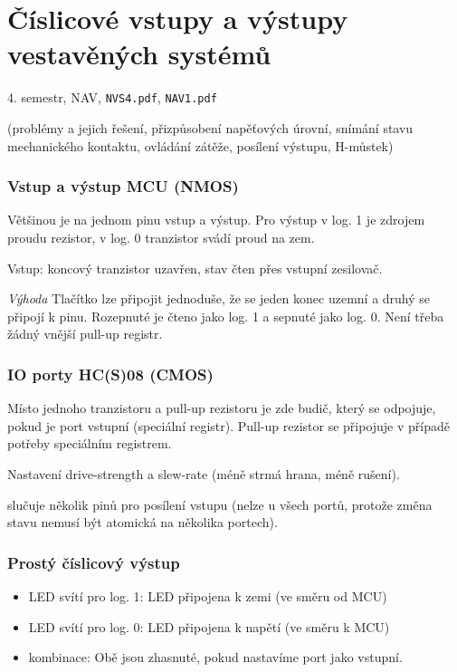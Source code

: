 \documentclass[a4paper, 11pt]{report}
\begin{document}
\chapter{Číslicové vstupy a výstupy vestavěných systémů} \label{cha:60}
4. semestr, NAV, \texttt{NVS4.pdf}, \texttt{NAV1.pdf}

(problémy a jejich řešení, přizpůsobení napěťových úrovní, snímání stavu mechanického kontaktu, ovládání zátěže, posílení výstupu, H-můstek)

\subsection{Vstup a výstup MCU (NMOS)}
Většinou je na jednom pinu vstup a výstup. Pro výstup v log. 1 je zdrojem proudu rezistor, v log. 0 tranzistor svádí proud na zem.

Vstup: koncový tranzistor uzavřen, stav čten přes vstupní zesilovač.

\emph{Výhoda} Tlačítko lze připojit jednoduše, že se jeden konec uzemní a druhý se připojí k pinu. Rozepnuté je čteno jako log. 1 a sepnuté jako log. 0. Není třeba žádný vnější pull-up registr.

\subsection{IO porty HC(S)08 (CMOS)}
Místo jednoho tranzistoru a pull-up rezistoru je zde budič, který se odpojuje, pokud je port vstupní (speciální registr). Pull-up rezistor se připojuje v případě potřeby speciálním registrem.

Nastavení drive-strength a slew-rate (méně strmá hrana, méně rušení).

 slučuje několik pinů pro posílení vstupu (nelze u všech portů, protože změna stavu nemusí být atomická na několika portech).

\subsection{Prostý číslicový výstup}
\begin{itemize}
	\item LED svítí pro log. 1: LED připojena k zemi (ve směru od MCU)
	\item LED svítí pro log. 0: LED připojena k napětí (ve směru k MCU)
	\item kombinace: Obě jsou zhasnuté, pokud nastavíme port jako vstupní.
\end{itemize}
\end{document}
